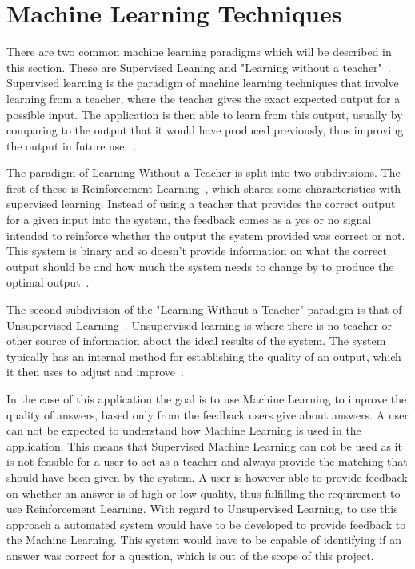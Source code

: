 \documentclass[authoryearcitations]{UoYCSproject}
\begin{document}

\section{Machine Learning Techniques}

There are two common machine learning paradigms which will be described in this section. These are Supervised Leaning and "Learning without a teacher"~\cite{haykin1999neural}. Supervised learning is the paradigm of machine learning techniques that involve learning from a teacher, where the teacher gives the exact expected output for a possible input. The application is then able to learn from this output, usually by comparing to the output that it would have produced previously, thus improving the output in future use.~\cite{incaLecture}.

The paradigm of Learning Without a Teacher is split into two subdivisions. The first of these is Reinforcement Learning~\cite{haykin1999neural}, which shares some characteristics with supervised learning. Instead of using a teacher that provides the correct output for a given input into the system, the feedback comes as a yes or no signal intended to reinforce whether the output the system provided was correct or not. This system is binary and so doesn't provide information on what the correct output should be and how much the system needs to change by to produce the optimal output~\cite{incaLecture}.

The second subdivision of the "Learning Without a Teacher" paradigm is that of Unsupervised Learning~\cite{haykin1999neural}. Unsupervised learning is where there is no teacher or other source of information about the ideal results of the system. The system typically has an internal method for establishing the quality of an output, which it then uses to adjust and improve~\cite{incaLecture}.

In the case of this application the goal is to use Machine Learning to improve the quality of answers, based only from the feedback users give about answers. A user can not be expected to understand how Machine Learning is used in the application. This means that Supervised Machine Learning can not be used as it is not feasible for a user to act as a teacher and always provide the matching that should have been given by the system. A user is however able to provide feedback on whether an answer is of high or low quality, thus fulfilling the requirement to use Reinforcement Learning. With regard to Unsupervised Learning, to use this approach a automated system would have to be developed to provide feedback to the Machine Learning. This system would have to be capable of identifying if an answer was correct for a question, which is out of the scope of this project. 
\end{document}
